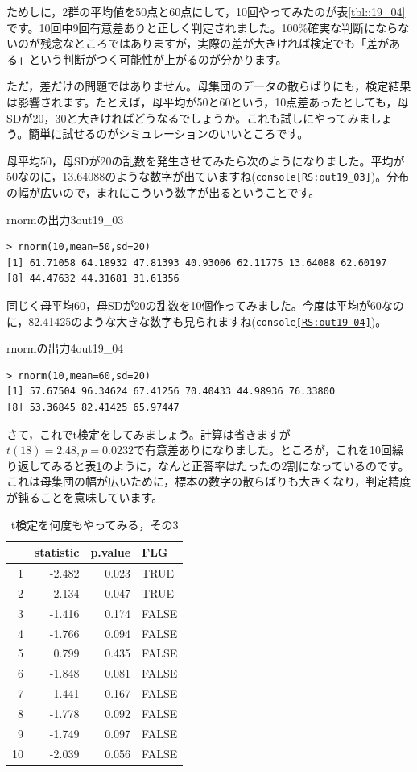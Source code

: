 \documentclass{ltjsarticle}
\begin{document}
ためしに，2群の平均値を50点と60点にして，10回やってみたのが表\ref{tbl::19_04}です。10回中9回有意差ありと正しく判定されました。100\%確実な判断にならないのが残念なところではありますが，実際の差が大きければ検定でも「差がある」という判断がつく可能性が上がるのが分かります。

ただ，差だけの問題ではありません。母集団のデータの散らばりにも，検定結果は影響されます。たとえば，母平均が50と60という，10点差あったとしても，母SDが20，30と大きければどうなるでしょうか。これも試しにやってみましょう。簡単に試せるのがシミュレーションのいいところです。

母平均50，母SDが20の乱数を発生させてみたら次のようになりました。平均が50なのに，13.64088のような数字が出ていますね(\texttt{console\ref{RS:out19_03}})。分布の幅が広いので，まれにこういう数字が出るということです。
\begin{Rscreen}{rnormの出力3}{out19_03}
	\begin{verbatim}
> rnorm(10,mean=50,sd=20)
[1] 61.71058 64.18932 47.81393 40.93006 62.11775 13.64088 62.60197
[8] 44.47632 44.31681 31.61356
\end{verbatim}
\end{Rscreen}

同じく母平均60，母SDが20の乱数を10個作ってみました。今度は平均が60なのに，82.41425のような大きな数字も見られますね(\texttt{console\ref{RS:out19_04}})。
\begin{Rscreen}{rnormの出力4}{out19_04}
	\begin{verbatim}
> rnorm(10,mean=60,sd=20)
[1] 57.67504 96.34624 67.41256 70.40433 44.98936 76.33800
[8] 53.36845 82.41425 65.97447
\end{verbatim}
\end{Rscreen}

さて，これでt検定をしてみましょう。計算は省きますが$t(18)=2.48,p=0.0232$で有意差ありになりました。ところが，これを10回繰り返してみると表\ref{tbl::19_05}のように，なんと正答率はたったの2割になっているのです。これは母集団の幅が広いために，標本の数字の散らばりも大きくなり，判定精度が鈍ることを意味しています。

\begin{table}[ht]
	\centering
	\caption{t検定を何度もやってみる，その3}
	\begin{tabular}{rrrl}
		\hline
		   & statistic & p.value & FLG   \\
		\hline
		1  & -2.482    & 0.023   & TRUE  \\
		2  & -2.134    & 0.047   & TRUE  \\
		3  & -1.416    & 0.174   & FALSE \\
		4  & -1.766    & 0.094   & FALSE \\
		5  & 0.799     & 0.435   & FALSE \\
		6  & -1.848    & 0.081   & FALSE \\
		7  & -1.441    & 0.167   & FALSE \\
		8  & -1.778    & 0.092   & FALSE \\
		9  & -1.749    & 0.097   & FALSE \\
		10 & -2.039    & 0.056   & FALSE \\
		\hline
	\end{tabular}
	\label{tbl::19_05}
\end{table}
\end{document}
